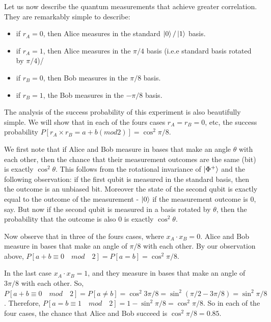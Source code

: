 Let us now describe the quantum measurements that achieve greater correlation. They are remarkably simple to describe:
\begin{itemize}
    \item if $r_A=0$, then Alice measures in the standard $\ket{0}/\ket{1}$ basis.
    \item if $r_A=1$, then Alice measures in the $\pi/4$ basis (i.e.e standard basis rotated by $\pi/4$)/
    \item if $r_B=0$, then Bob measures in the $\pi/8$ basis.
    \item if $r_B=1$, the Bob measures in the $-\pi/8$ basis.
\end{itemize}
The analysis of the success probability of this experiment is also beautifully simple. We will show that in each of the fours cases $r_A=r_B=0$, etc, the success probability $P[r_A \times r_B=a+b(mod2)]=\cos^2 \pi/8$.

We first note that if Alice and Bob measure in bases that make an angle $\theta$ with each other, then the chance that their measurement outcomes are the same (bit) is exactly $\cos^2 \theta$. This follows from the rotational invariance of $\ket{\Phi^{+}}$ and the following observation: if the first qubit is measured in the standard basis, then the outcome is an unbiased bit. Moreover the state of the second qubit is exactly equal to the outcome of the measurement - $\ket{0}$ if the measurement outcome is 0, say. But now if the second qubit is measured in a basis rotated by $\theta$, then the probability that the outcome is also $0$ is exactly $\cos^2 \theta$.

Now observe that in three of the fours cases, where $x_A\cdot x_B=0$. Alice and Bob measure in bases that make an angle of $\pi/8$ with each other. By our observation above, $P[a+b\equiv 0 \quad mod \quad 2]=P[a=b]=\cos^2 \pi/8$.

In the last case $x_A \cdot x_B=1$, and they measure in bases that make an angle of $3\pi/8$ with each other. So, $P[a+b \equiv 0 \quad mod \quad 2]=P[a \neq b] = \cos^2 3\pi/8=\sin^2 (\pi/2-3\pi/8)=\sin^2 \pi/8$. Therefore, $P[a=b \equiv 1 \quad mod \quad 2]=1-\sin^2 \pi/8=\cos^2 \pi/8$. So in each of the four cases, the chance that Alice and Bob succeed is $\cos^2 \pi/8=0.85$.


